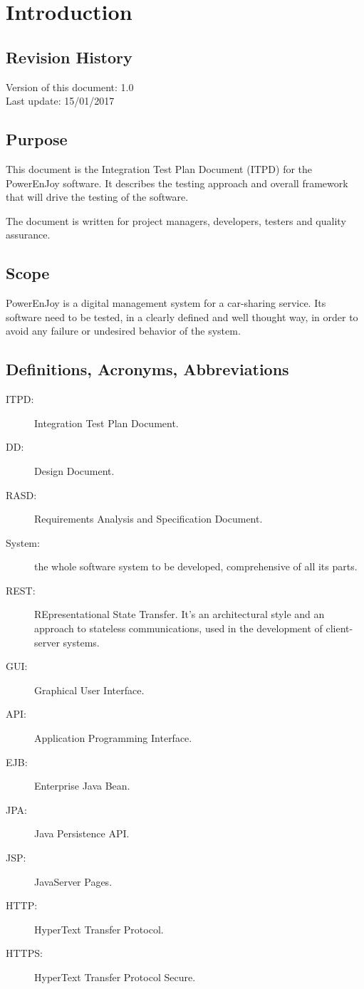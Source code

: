 \section{Introduction} \label{sec introduction}

\subsection{Revision History}

Version of this document: 1.0 \\
Last update: 15/01/2017

\subsection{Purpose}

This document is the Integration Test Plan Document (ITPD) for the PowerEnJoy software. It describes the testing approach and overall framework that will drive the testing of the software.

The document is written for project managers, developers, testers and quality assurance.

\subsection{Scope}

PowerEnJoy is a digital management system for a car-sharing service. Its software need to be tested, in a clearly defined and well thought way, in order to avoid any failure or undesired behavior of the system.
  
\subsection{Definitions, Acronyms, Abbreviations}

\begin{description}
	\item[ITPD:] Integration Test Plan Document.
	\item[DD:] Design Document.
	\item[RASD:] Requirements Analysis and Specification Document.
	\item[System:] the whole software system to be developed, comprehensive of all its parts.
	\item[REST:] REpresentational State Transfer. It's an architectural style and an approach to stateless communications, used in the development of client-server systems.
	\item[GUI:] Graphical User Interface.
	\item[API:] Application Programming Interface.
	\item[EJB:] Enterprise Java Bean.
	\item[JPA:] Java Persistence API.
	\item[JSP:] JavaServer Pages.
	\item[HTTP:] HyperText Transfer Protocol.
	\item[HTTPS:] HyperText Transfer Protocol Secure.
\end{description}

